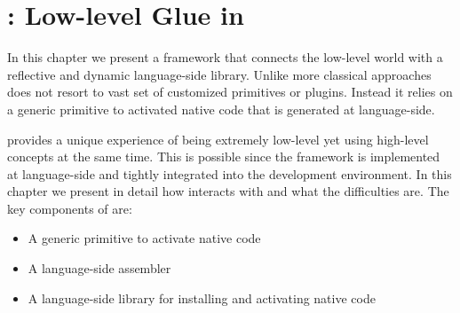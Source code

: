 
\chapter{\B: Low-level Glue in \PH}
\minitoc
\introduction


In this chapter we present \B a framework that connects the low-level \VM world with a reflective and dynamic language-side library.
Unlike more classical approaches \B does not resort to vast set of customized \VM primitives or plugins.
Instead it relies on a generic primitive to activated native code that is generated at language-side.

\B provides a unique experience of being extremely low-level yet using high-level concepts at the same time.
This is possible since the framework is implemented at language-side and tightly integrated into the \PH development environment.
In this chapter we present in detail how \B interacts with \PH and what the difficulties are.
The key components of \B are:
\begin{itemize}[noitemsep]
	\item A generic primitive to activate native code
	\item \AsmJIT A language-side assembler
	\item A language-side library for installing and activating native code
\end{itemize}

